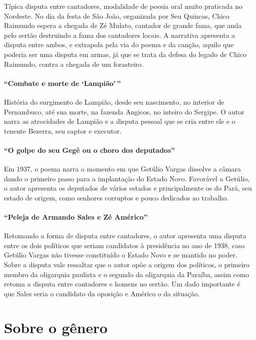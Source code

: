 Típica disputa entre cantadores, modalidade de 
poesia oral muito praticada no Nordeste. No dia da
festa de São João, organizada por Seu Quincas, Chico Raimundo espera a
chegada de Zé Mulato, cantador de grande fama, que anda pelo sertão
destruindo a fama dos cantadores locais. A narrativa apresenta a
disputa entre ambos, e extrapola pela via do poema e da canção, aquilo
que poderia ser uma disputa em armas, já que se trata da defesa do
legado de Chico Raimundo, contra a chegada de um forasteiro.


\paragraph{``Combate e morte de `Lampião'\,''}

História do surgimento de Lampião, desde seu nascimento, no interior de
Pernambuco, até sua morte, na fazenda Angicos, no inteiro do Sergipe. O
autor narra as atrocidades de Lampião e a disputa pessoal que se cria
entre ele e o tenente Bezerra, seu captor e executor.

\paragraph{``O golpe do seu Gegê ou o choro dos deputados''}

Em 1937, o poema narra o momento em que Getúlio Vargas dissolve a câmara
dando o primeiro passo para a implantação do Estado Novo. Favorável a
Getúlio, o autor apresenta os deputados de vários estados e
principalmente os do Pará, seu estado de origem, como senhores
corruptos e pouco dedicados ao trabalho.

\paragraph{``Peleja de Armando Sales e Zé Américo''}

Retomando a forma de disputa entre cantadores, o autor apresenta uma
disputa entre os dois políticos que seriam candidatos à presidência no
ano de 1938, caso Getúlio Vargas não tivesse constituído o Estado Novo
e se mantido no poder. Sobre a disputa vale ressaltar que o autor opõe
a origem dos políticos, o primeiro membro da oligarquia paulista e o
segundo da oligarquia da Paraíba, assim como retoma a disputa entre
cantadores e homens no sertão. Um dado importante é que Sales seria o
candidato da oposição e Américo o da situação. 


\section{Sobre o gênero}

